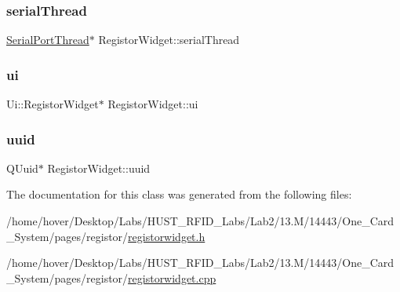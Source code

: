 \mbox{\label{class_registor_widget_a445746b63d370fe0985a4bcd2630a5ac}} 
\subsubsection{\texorpdfstring{serialThread}{serialThread}}
{\footnotesize\ttfamily \mbox{\hyperlink{class_serial_port_thread}{Serial\+Port\+Thread}}$\ast$ Registor\+Widget\+::serial\+Thread\hspace{0.3cm}{\ttfamily [private]}}

\mbox{\label{class_registor_widget_a906ebcf60a8e3e8d8c0c1b43dfada66b}} 
\subsubsection{\texorpdfstring{ui}{ui}}
{\footnotesize\ttfamily Ui\+::\+Registor\+Widget$\ast$ Registor\+Widget\+::ui\hspace{0.3cm}{\ttfamily [private]}}

\mbox{\label{class_registor_widget_a2deb7fe978f1bf51f42281d9145d553d}} 
\subsubsection{\texorpdfstring{uuid}{uuid}}
{\footnotesize\ttfamily Q\+Uuid$\ast$ Registor\+Widget\+::uuid\hspace{0.3cm}{\ttfamily [private]}}



The documentation for this class was generated from the following files\+:\begin{DoxyCompactItemize}
\item 
/home/hover/\+Desktop/\+Labs/\+H\+U\+S\+T\+\_\+\+R\+F\+I\+D\+\_\+\+Labs/\+Lab2/13.\+M/14443/\+One\+\_\+\+Card\+\_\+\+System/pages/registor/\mbox{\hyperlink{registorwidget_8h}{registorwidget.\+h}}\item 
/home/hover/\+Desktop/\+Labs/\+H\+U\+S\+T\+\_\+\+R\+F\+I\+D\+\_\+\+Labs/\+Lab2/13.\+M/14443/\+One\+\_\+\+Card\+\_\+\+System/pages/registor/\mbox{\hyperlink{registorwidget_8cpp}{registorwidget.\+cpp}}\end{DoxyCompactItemize}
